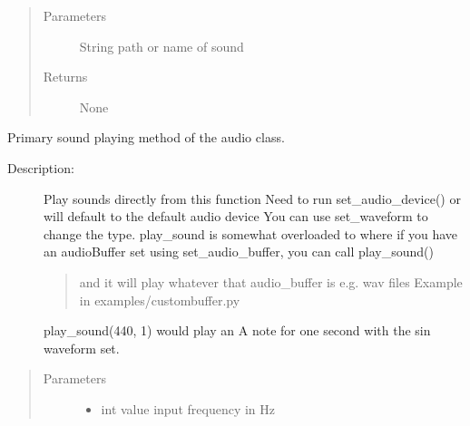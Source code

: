 \documentclass[letterpaper,10pt,english,openany,oneside]{sphinxmanual}
\begin{document}
\begin{fulllineitems}
\begin{fulllineitems}
\begin{description}
\end{description}
\begin{quote}\begin{description}
\item[{Parameters}] \leavevmode
\sphinxAtStartPar
{} \textendash{} String path or name of sound

\item[{Returns}] \leavevmode
\sphinxAtStartPar
None

\end{description}\end{quote}

\end{fulllineitems}


\begin{fulllineitems}
\label{\detokenize{dpav:dpav.audio.Audio.play_sound}}
\sphinxAtStartPar
Primary sound playing method of the audio class.
\begin{description}
\item[{Description:}] \leavevmode
\sphinxAtStartPar
Play sounds directly from this function
Need to run set\_audio\_device() or will default to the default audio device
You can use set\_waveform to change the type.
play\_sound is somewhat overloaded to where if you have an audioBuffer set using set\_audio\_buffer, you can call play\_sound()
\begin{quote}

\sphinxAtStartPar
and it will play whatever that audio\_buffer is e.g. wav files
Example in examples/custombuffer.py
\end{quote}

\sphinxAtStartPar
play\_sound(440, 1) would play an A note for one second with the sin waveform set.

\end{description}
\begin{quote}\begin{description}
\item[{Parameters}] \leavevmode\begin{itemize}
\item {} 
\sphinxAtStartPar
{} \textendash{} int value \sphinxhyphen{} input frequency in Hz


\end{itemize}
\end{description}
\end{quote}
\end{fulllineitems}
\end{fulllineitems}
\end{document}
